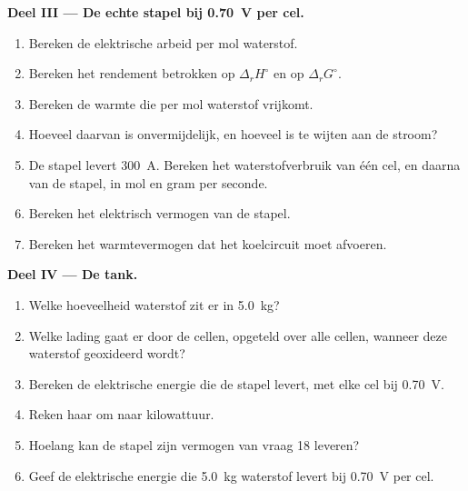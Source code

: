 \begin{problem}
\medskip
\noindent\textbf{Deel III --- De echte stapel bij \qty{0.70}{V} per cel.}
\begin{enumerate}[resume]
  \item Bereken de elektrische arbeid per mol waterstof.
  \item Bereken het rendement betrokken op $\Delta_r H^\circ$ en op $\Delta_r G^\circ$.
  \item Bereken de warmte die per mol waterstof vrijkomt.
  \item Hoeveel daarvan is onvermijdelijk, en hoeveel is te wijten aan de stroom?
  \item De stapel levert \qty{300}{A}. Bereken het waterstofverbruik van één
        cel, en daarna van de stapel, in mol en gram per seconde.
  \item Bereken het elektrisch vermogen van de stapel.
  \item Bereken het warmtevermogen dat het koelcircuit moet afvoeren.
\end{enumerate}

\medskip
\noindent\textbf{Deel IV --- De tank.}
\begin{enumerate}[resume]
  \item Welke hoeveelheid waterstof zit er in \qty{5.0}{kg}?
  \item Welke lading gaat er door de cellen, opgeteld over alle cellen, wanneer
        deze waterstof geoxideerd wordt?
  \item Bereken de elektrische energie die de stapel levert, met elke cel bij
        \qty{0.70}{V}.
  \item Reken haar om naar kilowattuur.
  \item Hoelang kan de stapel zijn vermogen van vraag 18 leveren?
  \item Geef de elektrische energie die \qty{5.0}{kg} waterstof levert bij
        \qty{0.70}{V} per cel.
\end{enumerate}
\end{problem}
